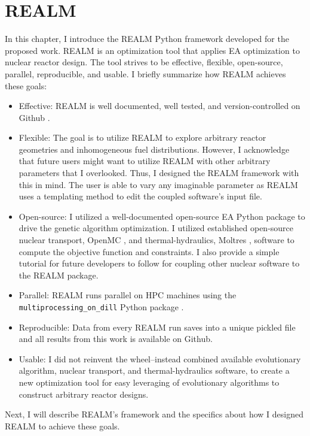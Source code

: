 \chapter{REALM}

In this chapter, I introduce the \gls{REALM} Python framework developed for the
proposed work.
\gls{REALM} is an optimization tool that applies \gls{EA} optimization to 
nuclear reactor design. 
The tool strives to be effective, flexible, open-source, parallel, reproducible, 
and usable. 
I briefly summarize how \gls{REALM} achieves these goals:  
\begin{itemize}
    \item Effective: \gls{REALM} is well documented, well tested, and 
    version-controlled on Github \cite{chee_arfcrealm_2021}.
    \item Flexible: The goal is to utilize \gls{REALM} to explore arbitrary 
    reactor geometries and inhomogeneous fuel distributions. However, I 
    acknowledge that future users might want to utilize \gls{REALM} with other
    arbitrary parameters that I overlooked. Thus, I designed the \gls{REALM}
    framework with this in mind. The user is able to vary any imaginable parameter 
    as \gls{REALM} uses a templating method to edit the coupled software's input 
    file.
    \item Open-source: I utilized a well-documented open-source \gls{EA} Python 
    package to drive the genetic algorithm optimization. I utilized established 
    open-source nuclear transport, OpenMC \cite{romano_openmc_2013}, and 
    thermal-hydraulics, Moltres \cite{lindsay_introduction_2018}, software to 
    compute the objective function and constraints. I also provide a simple 
    tutorial for future developers to follow for coupling other nuclear software 
    to the \gls{REALM} package.  
    \item Parallel: \gls{REALM} runs parallel on \gls{HPC} machines using the 
    \texttt{multiprocessing\_on\_dill} Python package 
    \cite{smallshire_multiprocessing_on_dill_nodate}.
    \item Reproducible: Data from every REALM run saves into a unique pickled file
    and all results from this work is available on Github. 
    \item Usable: I did not reinvent the wheel--instead combined available 
    evolutionary algorithm, nuclear transport, and thermal-hydraulics software, 
    to create a new optimization tool for easy leveraging of evolutionary algorithms 
    to construct arbitrary reactor designs. 
\end{itemize}
Next, I will describe \gls{REALM}'s framework and the specifics about how 
I designed \gls{REALM} to achieve these goals. 

